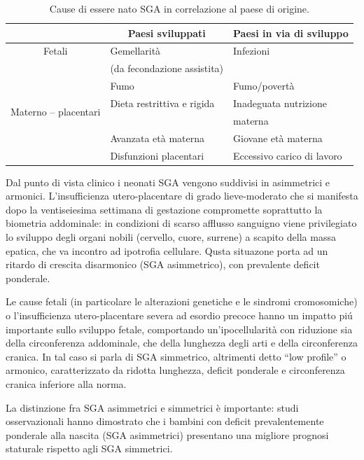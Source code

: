 \begin{table}[h]\centering
\begin{tabular}{cll}
\toprule
			& \multicolumn{1}{c}{Paesi sviluppati}			& \multicolumn{1}{c}{Paesi in via di sviluppo} \\
\midrule
Fetali & Gemellarit\`a  			& Infezioni			\\
 & (da fecondazione assistita) & \\\midrule
\multirow{4}{*}{Materno -- placentari} & Fumo						& Fumo/povertà		\\\cmidrule(l){2-3}
			& Dieta restrittiva e rigida	& Inadeguata nutrizione\\
			& &  materna \\\cmidrule(l){2-3}
			& Avanzata età materna  &	Giovane età materna \\\cmidrule(l){2-3}
			& Disfunzioni placentari	& Eccessivo carico di lavoro	\\\bottomrule
\end{tabular}
\label{tab-cause}
\caption{Cause di essere nato SGA in correlazione al paese di origine.}
\end{table}


  
Dal punto di vista clinico i neonati SGA vengono suddivisi in asimmetrici e armonici.
L'insufficienza utero-placentare di grado lieve-moderato che si manifesta dopo la 
ventiseiesima settimana di gestazione compromette soprattutto la biometria addominale: 
in condizioni di scarso afflusso sanguigno viene privilegiato lo sviluppo degli 
organi nobili (cervello, cuore, surrene) a scapito della massa epatica, che va incontro ad ipotrofia cellulare. 
Qusta situazone porta ad un ritardo di crescita disarmonico (SGA asimmetrico), con prevalente deficit ponderale.


Le cause fetali (in particolare le alterazioni genetiche e le sindromi cromosomiche) o l'insufficienza utero-placentare severa ad esordio 
precoce hanno un impatto pi\'u importante sullo sviluppo fetale, comportando un'ipocellularità con 
riduzione sia della circonferenza addominale, che della lunghezza degli arti e 
della circonferenza cranica. In tal caso si parla di SGA simmetrico, altrimenti detto "`low profile"' o armonico, caratterizzato da ridotta lunghezza, deficit ponderale e circonferenza cranica inferiore alla norma.


La distinzione fra SGA asimmetrici e simmetrici \`e importante: studi osservazionali 
hanno dimostrato che i bambini con deficit prevalentemente ponderale alla nascita 
(SGA asimmetrici) presentano una migliore prognosi staturale rispetto agli SGA simmetrici.\cite{sga-10}

